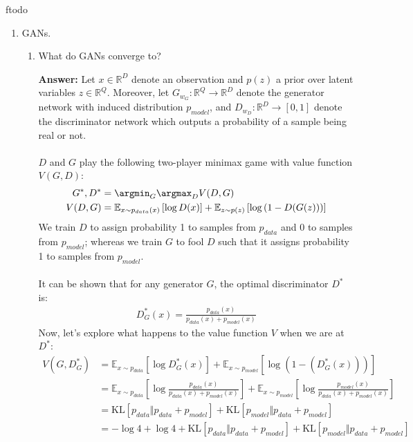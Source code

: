 ƒtodo\documentclass{article}
\newenvironment{QandA}{\begin{enumerate}[label=\arabic*.]}{\end{enumerate}}
\newenvironment{InnerQandA}{\begin{enumerate}[label=\roman*.]}{\end{enumerate}}
\newenvironment{answer}{\par\normalfont \textbf{Answer:}}{}
\newcommand{\R}{\mathbb{R}}
\newcommand{\KL}[2]{\text{KL}\left[#1 \Vert #2 \right]}
\begin{document}
\begin{QandA}
    \item GANs.
    \begin{InnerQandA}
        \item What do GANs converge to?
        \begin{answer}
            Let $x \in \R^D$ denote an observation and $p(z)$ a prior over latent variables $z \in \R^Q$. Moreover, let $G_{w_G}: \R^Q \rightarrow \R^D$ denote the generator network with induced distribution $p_{model}$, and $D_{w_D}: \R^D \rightarrow \left[ 0, 1\right]$ denote the discriminator network which outputs a probability of a sample being real or not. \\\\
            $D$ and $G$ play the following  two-player minimax game with value function $V(G, D)$:
            \begin{align*}
                G^*, D^* &= \argmin_{G} \argmax_{D} V(D, G) \\
                V(D, G) &= \mathbb{E}_{x \sim p_{data}(x)}\left[ \log D(x) \right] + \mathbb{E}_{z \sim p(z)} \left[\log \left( 1 - D(G(z)) \right) \right]
            \end{align*}
            We train $D$ to assign probability 1 to samples from $p_{data}$ and 0 to samples from $p_{model}$; whereas we train $G$ to fool $D$ such that it assigns probability 1 to samples from $p_{model}$.\\\\
            It can be shown that for any generator $G$, the optimal discriminator $D^*$ is:
            \begin{align*}
                D^*_{G}(x) = \frac{p_{data}(x)}{p_{data}(x) + p_{model}(x)}
            \end{align*}
            Now, let's explore what happens to the value function $V$ when we are at $D^*$:
            \begin{align*}
                V(G, D^*_G) &= \mathbb{E}_{x \sim p_{data}} \left[ \log D^*_G(x) \right] + \mathbb{E}_{x \sim p_{model}} \left[\log(1 - \left( D^*_G (x) \right)) \right] \\
                &= \mathbb{E}_{x \sim p_{data}} \left[ \log \frac{p_{data}(x)}{p_{data}(x) + p_{model}(x)}\right] + \mathbb{E}_{x \sim p_{model}} \left[ \log \frac{p_{model}(x)}{p_{data}(x) + p_{model}(x)}\right] \\
                &= \KL{p_{data}}{p_{data} + p_{model}} + \KL{p_{model}}{p_{data} + p_{model}}  \\
                &= -\log4 + \log4 + \KL{p_{data}}{p_{data} + p_{model}} + \KL{p_{model}}{p_{data} + p_{model}} \\

\end{align*}
\end{answer}
\end{InnerQandA}
\end{QandA}
\end{document}
